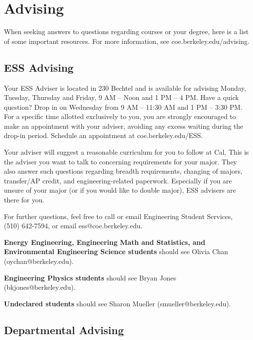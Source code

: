 \chapter*{Advising}

When seeking answers to questions regarding courses or your degree, here is a list of some important resources. For more information, see {\selectfont coe.berkeley.edu/advising}.

\section*{ESS Advising}

Your ESS Adviser is located in 230 Bechtel and is available for advising Monday, Tuesday, Thursday and Friday, 9 AM – Noon and 1 PM – 4 PM. Have a quick question? Drop in on Wednesday from 9 AM – 11:30 AM and 1 PM – 3:30 PM. For a specific time allotted exclusively to you, you are strongly encouraged to make an appointment with your adviser, avoiding any excess waiting during the drop-in period. Schedule an appointment at {\selectfont coe.berkeley.edu/ESS}.

Your adviser will suggest a reasonable curriculum for you to follow at Cal. This is the adviser you want to talk to concerning requirements for your major. They also answer such questions regarding breadth requirements, changing of majors, transfer/AP credit, and engineering-related paperwork. Especially if you are unsure of your major (or if you would like to double major), ESS advisers are there for you.

For further questions, feel free to call or email Engineering Student Services, (510) 642-7594, or email {\selectfont ess@coe.berkeley.edu}.

\textbf{Energy Engineering, Engineering Math and Statistics, and Environmental Engineering Science students} should see Olivia Chan ({\selectfont oychan@berkeley.edu}).

\textbf{Engineering Physics students} should see Bryan Jones ({\selectfont bkjones@berkeley.edu}).

\textbf{Undeclared students} should see Sharon Mueller ({\selectfont smueller@berkeley.edu}).

\section*{Departmental Advising}

